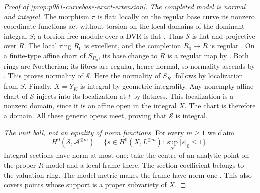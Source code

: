\begin{proof}[Proof of \cref{prop:p081-curvebase-exact-extension}]
\emph{The completed model is normal and integral.}
The morphism \(\pi\) is flat: locally on the regular base curve its
nonzero coordinate functions act without torsion on the local domains
of the dominant integral \(S\); a torsion-free module over a DVR is
flat \cite[Tag 0539]{Stacks}. Thus \(\mathscr S\) is flat and projective
over \(R\). The local ring \(R_0\) is excellent, and the completion
\(R_0\to R\) is regular
\cite[Tags 07QS and 07GH]{Stacks}. On a finite-type affine chart of
\(S_{R_0}\), its base change to \(R\) is a regular map by
\cite[Tag 07C1]{Stacks}. Both rings are Noetherian; its fibres are
regular, hence normal, so normality ascends by
\cite[Tag 0C22]{Stacks}. This proves normality of \(\mathscr S\).
Here the normality of \(S_{R_0}\) follows by localization from \(S\).
Finally, \(X=Y_K\) is integral by geometric integrality. Any nonempty
affine chart of \(\mathscr S\) injects into its localization at \(t\)
by flatness. This localization is a nonzero domain, since it is an
affine open in the integral \(X\). The chart is therefore a domain.
All these generic opens meet, proving that \(\mathscr S\) is integral.

\emph{The unit ball, not an equality of norm functions.}
For every \(m\geq1\) we claim
\begin{equation}\label{eq:p081-curvebase-unitball}
 H^0(\mathscr S,\mathscr A^{\otimes m})
   =\{s\in H^0(X,L^{\otimes m}):\sup_{\mathcal F}|s|_0\leq1\}.
\end{equation}
Integral sections have norm at most one: take the centre of an analytic
point on the proper \(R\)-model and a local frame there. The section
coefficient belongs to the valuation ring. The model metric makes the
frame have norm one \cite[\S5.3]{BE2021}. This also covers points
whose support is a proper subvariety of \(X\).


\end{proof}
